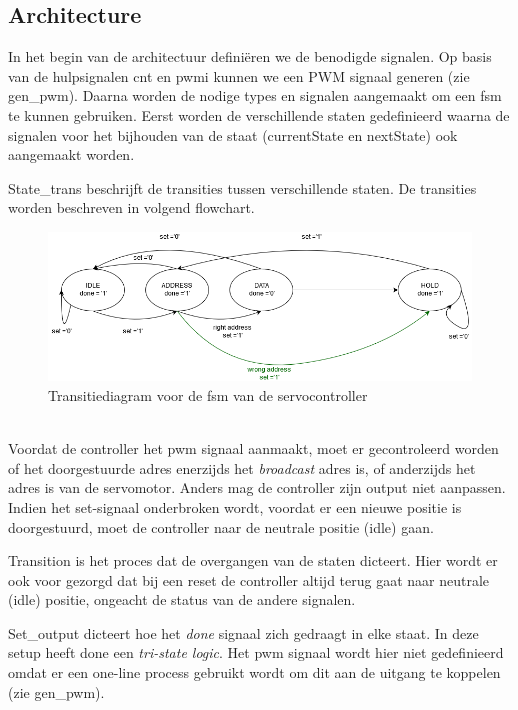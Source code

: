 \subsection{Architecture}
In het begin van de architectuur defini\"{e}ren we de benodigde signalen. Op basis van de hulpsignalen cnt en pwmi kunnen we een PWM signaal generen (zie gen\_pwm). Daarna worden de nodige types en signalen aangemaakt om een \gls{fsm} te kunnen gebruiken. Eerst worden de verschillende staten gedefinieerd waarna de signalen voor het bijhouden van de staat (currentState en nextState) ook aangemaakt worden.


State\_trans beschrijft de transities tussen verschillende staten. De transities worden beschreven in volgend flowchart.
\begin{figure}[h]
	\centering
	\includegraphics[width=\linewidth]{servocontrol.png}
	\caption{Transitiediagram voor de \gls{fsm} van de servocontroller}
\end{figure}\\
 Voordat de controller het \gls{pwm} signaal aanmaakt, moet er gecontroleerd worden of het doorgestuurde adres enerzijds het \textit{broadcast} adres is, of anderzijds het adres is van de servomotor. Anders mag de controller zijn output niet aanpassen. Indien het set-signaal onderbroken wordt, voordat er een nieuwe positie is doorgestuurd, moet de controller naar de neutrale positie (idle) gaan.


Transition is het proces dat de overgangen van de staten dicteert. Hier wordt er ook voor gezorgd dat bij een reset de controller altijd terug gaat naar neutrale (idle) positie, ongeacht de status van de andere signalen.


Set\_output dicteert hoe het \textit{done} signaal zich gedraagt in elke staat. In deze setup heeft done een \textit{tri-state logic}. Het \gls{pwm} signaal wordt hier niet gedefinieerd omdat er een one-line process gebruikt wordt om dit aan de uitgang te koppelen (zie gen\_pwm).

